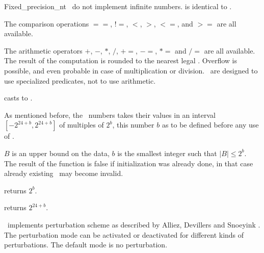 \begin{ccClass}{Fixed_precision_nt}
{ \ccClassName\ do not implement infinite numbers. 
   is identical to .}

The comparison operations $==$, $!=$, $<$, $>$, $<=$, and $>=$ are all
available.

The arithmetic operators $+$, $-$, $*$, $/$, $+=$, $-=$, $*=$ and $/=$
are all available. The result of the computation is rounded to the
nearest legal \ccClassName. Overflow is possible, and even probable in case
of multiplication or division. \ccClassName\ are designed to use
specialized predicates, not to use arithmetic.


         {casts to .}



As mentioned before, the \ccClassName\ numbers takes their values in an
interval $[-2^{24+b},2^{24+b}]$ of multiples of $2^b$,
this number $b$ as to be defined before any
 use of .


{$B$ is an upper bound on the data, $b$ is the smallest integer such that 
$|B|\leq 2^b$. The result of the function is false if initialization was
already done, in that case already existing \ccClassName\ may become invalid.}

{returns $2^b$.}

{returns $2^{24+b}$.}


\ccClassName\ implements perturbation scheme as described by
Alliez, Devillers and Snoeyink \cite{ads-rdppw-98}.
The perturbation mode can be activated or deactivated for different kinds
of perturbations. The default mode is no perturbation.


\end{ccClass}
